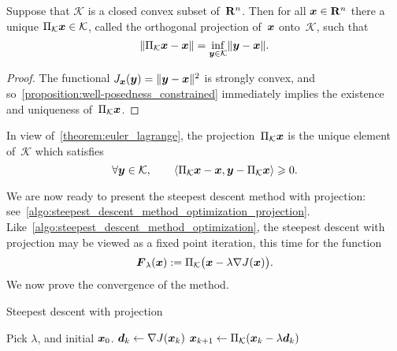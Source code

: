 \begin{proposition}
    Suppose that $\mathcal K$ is a closed convex subset of~$\mathbf R^n$.
    Then for all $\mathbf{\boldsymbol{x}} \in \mathbf R^n$ there a unique $\Pi_{\mathcal K} \mathbf{\boldsymbol{x}} \in \mathcal K$,
    called the orthogonal projection of~$\mathbf{\boldsymbol{x}}$ onto~$\mathcal K$,
    such that
    \[
        \lVert\Pi_{\mathcal K} \mathbf{\boldsymbol{x}} - \mathbf{\boldsymbol{x}}\rVert = \inf_{\mathbf{\boldsymbol{y}} \in \mathcal K} \lVert\mathbf{\boldsymbol{y}} - \mathbf{\boldsymbol{x}}\rVert.
    \]
\end{proposition}
\begin{proof}
    The functional $J_{\mathbf{\boldsymbol{x}}}(\mathbf{\boldsymbol{y}}) = \lVert\mathbf{\boldsymbol{y}} - \mathbf{\boldsymbol{x}}\rVert^2$ is strongly convex,
    and so~\cref{proposition:well-posedness_constrained} immediately implies the existence and uniqueness of~$\Pi_{\mathcal K} \mathbf{\boldsymbol{x}}$.
\end{proof}

\begin{remark}
    In view of~\cref{theorem:euler_lagrange},
    the projection~$\Pi_{\mathcal K} \mathbf{\boldsymbol{x}}$ is the unique element of~$\mathcal K$ which satisfies
    \begin{equation}
        \label{eq:euler_lagrange_projection}
        \forall \mathbf{\boldsymbol{y}} \in \mathcal K,
        \qquad \langle\Pi_{\mathcal K} \mathbf{\boldsymbol{x}} - \mathbf{\boldsymbol{x}}, \mathbf{\boldsymbol{y}} - \Pi_{\mathcal K}\mathbf{\boldsymbol{x}}\rangle \geqslant 0.
    \end{equation}
\end{remark}

We are now ready to present the steepest descent method with projection:
see~\cref{algo:steepest_descent_method_optimization_projection}.
Like~\cref{algo:steepest_descent_method_optimization},
the steepest descent with projection may be viewed as a fixed point iteration,
this time for the function
\begin{equation}
    \label{eq:constrained_fixed_point}
    \mathbf{\boldsymbol{F}}_{\lambda}(\mathbf{\boldsymbol{x}}) := \Pi_{\mathcal K}\bigl(\mathbf{\boldsymbol{x}} - \lambda \nabla J(\mathbf{\boldsymbol{x}})\bigr).
\end{equation}
We now prove the convergence of the method.
\begin{algorithm}
\caption{Steepest descent with projection}%
\label{algo:steepest_descent_method_optimization_projection}%
\begin{algorithmic}[1]
    \State Pick $\lambda$, and initial $\mathbf{\boldsymbol{x}}_0$.
        \State $\mathbf{\boldsymbol{d}}_k \gets \nabla J(\mathbf{\boldsymbol{x}}_k)$
        \State $\mathbf{\boldsymbol{x}}_{k+1} \gets \Pi_{\mathcal K}(\mathbf{\boldsymbol{x}}_{k} - \lambda \mathbf{\boldsymbol{d}}_k)$
    \EndFor
\end{algorithmic}
\end{algorithm}

